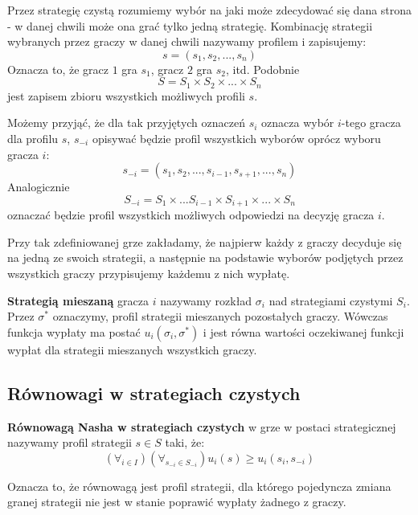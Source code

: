 \documentclass[polish]{standalone}
\begin{document}
Przez strategię czystą rozumiemy wybór na jaki może zdecydować się dana strona - w danej chwili może ona grać tylko
jedną strategię. Kombinację strategii wybranych przez graczy w danej chwili nazywamy profilem i zapisujemy:
$$s = (s_1, s_2, ..., s_n)$$
Oznacza to, że gracz $1$ gra $s_1$, gracz $2$ gra $s_2$, itd. Podobnie
$$S = S_1 \times S_2 \times ... \times S_n$$
jest zapisem zbioru wszystkich możliwych profili $s$.

Możemy przyjąć, że dla tak przyjętych oznaczeń $s_i$ oznacza wybór $i$-tego gracza dla profilu $s$, $s_{-i}$ opisywać
będzie profil wszystkich wyborów oprócz wyboru gracza $i$:
$$s_{-i} = (s_1, s_2, ..., s_{i-1}, s_{s+1}, ..., s_n)$$
Analogicznie
$$S_{-i} = S_1 \times ... S_{i-1} \times S_{i+1} \times ... \times S_n$$
oznaczać będzie profil wszystkich możliwych odpowiedzi na decyzję gracza $i$.

Przy tak zdefiniowanej grze zakładamy, że najpierw każdy z graczy decyduje się na jedną ze swoich strategii, a następnie
na podstawie wyborów podjętych przez wszystkich graczy przypisujemy każdemu z nich wypłatę.

\begin{definition}
\textbf{Strategią mieszaną}  gracza $i$ nazywamy rozkład $\sigma_i$ nad strategiami czystymi
$S_i$. Przez $\sigma^{*}$ oznaczymy, profil strategii mieszanych pozostałych graczy. Wówczas funkcja wypłaty ma postać
$u_i(\sigma_i, \sigma^{*})$ i jest równa wartości oczekiwanej funkcji wypłat dla strategii mieszanych wszystkich graczy.
\cite[str.~5]{FT-GT}
\end{definition}

\subsection{Równowagi w strategiach czystych}

\begin{definition}
\textbf{Równowagą Nasha  w strategiach czystych} w grze w postaci strategicznej nazywamy profil
strategii $s \in S$ taki, że:
$$(\forall_{i \in I}) (\forall_{s_{-i} \in S_{-i}}) u_i(s) \geq u_i(s_i, s_{-i})$$
\cite[str.~11]{FT-GT}
\end{definition}

Oznacza to, że równowagą jest profil strategii, dla którego pojedyncza zmiana granej strategii nie jest w stanie 
poprawić wypłaty żadnego z graczy.
\end{document}
